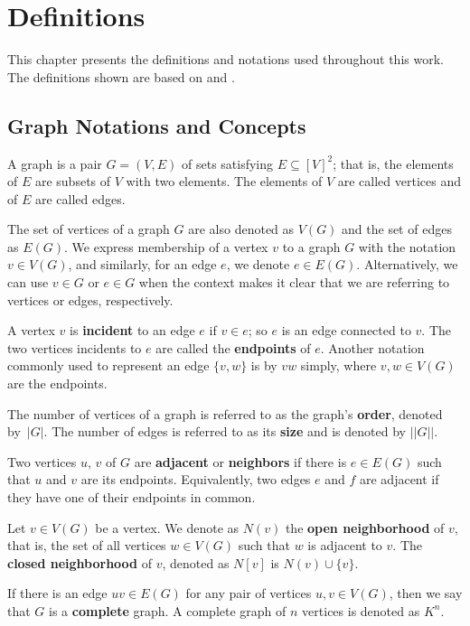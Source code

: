 \chapter{Definitions}
\label{chapter:definitions}

This chapter presents the definitions and notations used throughout this work. The definitions shown are based on \cite{BondyNMurty} and \cite{Diestel}.

\section{Graph Notations and Concepts}

A graph is a pair \(G = (V, E)\) of sets satisfying \(E \subseteq [V]^2\); that is, the elements of \(E\) are subsets of \(V\) with two elements. The elements of \(V\) are called vertices and of \(E\) are called edges.

The set of vertices of a graph $G$ are also denoted as \(V(G)\) and the set of edges as \(E(G)\). We express membership of a vertex \(v\) to a graph \(G\) with the notation \(v \in V(G)\), and similarly, for an edge \(e\), we denote \(e \in E(G)\). Alternatively, we can use \(v \in G\) or \(e \in G\) when the context makes it clear that we are referring to vertices or edges, respectively.

A vertex \(v\) is \textbf{incident} to an edge \(e\) if \(v \in e\); so \(e\) is an edge connected to \(v\). The two vertices incidents to \(e\) are called the \textbf{endpoints} of \(e\). Another notation commonly used to represent an edge \(\{v, w\}\) is by \(vw\) simply, where \(v, w \in V(G)\) are the endpoints.

The number of vertices of a graph is referred to as the graph's \textbf{order}, denoted by~\(|G|\). The number of edges is referred to as its \textbf{size} and is denoted by \(||G||\).

Two vertices \(u\), \(v\) of \(G\) are \textbf{adjacent} or \textbf{neighbors} if there is \(e \in E(G)\) such that \(u\) and \(v\) are its endpoints. Equivalently, two edges \(e\) and \(f\) are adjacent if they have one of their endpoints in common.

Let \(v \in V(G)\) be a vertex. We denote as \(N(v)\) the \textbf{open neighborhood} of \(v\), that is, the set of all vertices \(w \in V(G)\) such that \(w\) is adjacent to \(v\). The \textbf{closed neighborhood} of \(v\), denoted as \(N[v]\) is \(N(v) \cup \{v\}\).

If there is an edge \(uv \in E(G)\) for any pair of vertices \(u, v \in V(G)\),  then we say that \(G\) is a \textbf{complete} graph. A complete graph of \(n\) vertices is denoted as \(K^n\).

